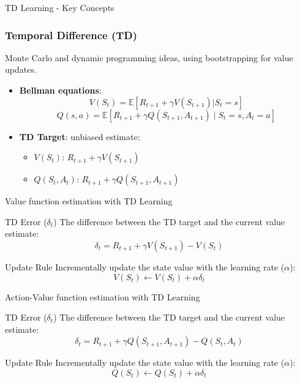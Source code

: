 \documentclass{beamer}
\begin{document}
\begin{frame}{TD Learning - Key Concepts}
\frametitle{Temporal Difference (TD)}

Monte Carlo and dynamic programming ideas, using bootstrapping for value updates.

\begin{itemize}
    \item \textbf{Bellman equations}:
    \[V(S_t) = \mathbb{E}[R_{t+1} + \gamma V(S_{t+1}) | S_t = s]\]
    \[Q(s, a) = \mathbb{E} [R_{t+1} + \gamma Q(S_{t+1}, A_{t+1}) \mid S_t = s, A_t = a]\]

    \item \textbf{TD Target}: unbiased estimate:
    \begin{itemize}
        \item \(V(S_t)\): \(R_{t+1} + \gamma V(S_{t+1})\)
        \item \(Q(S_t, A_t)\): \(R_{t+1} + \gamma Q(S_{t+1}, A_{t+1})\)
    \end{itemize}
\end{itemize}
\end{frame}
\begin{frame}{Value function estimation with TD Learning}

\begin{block}{TD Error (\(\delta_t\))}
The difference between the TD target and the current value estimate:
\[\delta_t = R_{t+1} + \gamma V(S_{t+1}) - V(S_t)\]
\end{block}

\begin{block}{Update Rule}
Incrementally update the state value with the learning rate (\(\alpha\)):
\[V(S_t) \leftarrow V(S_t) + \alpha \delta_t\]
\end{block}

\end{frame}

\begin{frame}{Action-Value function estimation with TD Learning}

\begin{block}{TD Error (\(\delta_t\))}
The difference between the TD target and the current value estimate:
\[\delta_t = R_{t+1} + \gamma Q(S_{t+1}, A_{t+1}) - Q(S_t, A_t)\]
\end{block}

\begin{block}{Update Rule}
Incrementally update the state value with the learning rate (\(\alpha\)):
\[Q(S_t) \leftarrow Q(S_t) + \alpha \delta_t\]
\end{block}

\end{frame}
\end{document}
